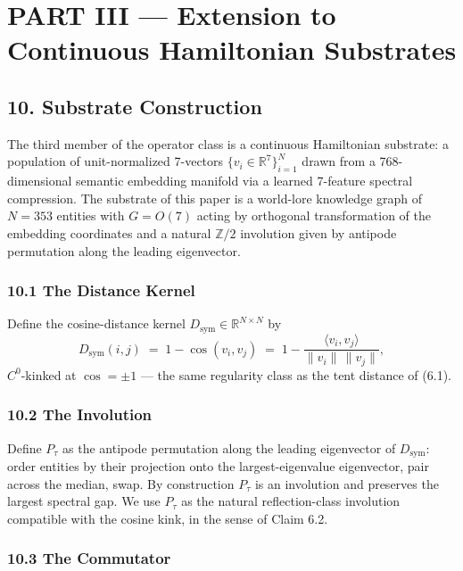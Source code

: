 \documentclass[
  11pt,
]{article}
\begin{document}
\section{PART III --- Extension to Continuous Hamiltonian
Substrates}\label{part-iii-extension-to-continuous-hamiltonian-substrates}

\subsection{10. Substrate Construction}\label{substrate-construction}

The third member of the operator class is a continuous Hamiltonian
substrate: a population of unit-normalized 7-vectors
\(\{v_i \in \mathbb{R}^7\}_{i=1}^N\) drawn from a 768-dimensional
semantic embedding manifold via a learned 7-feature spectral
compression. The substrate of this paper is a world-lore knowledge graph
of \(N = 353\) entities with \(G = O(7)\) acting by orthogonal
transformation of the embedding coordinates and a natural
\(\mathbb{Z}/2\) involution given by antipode permutation along the
leading eigenvector.

\subsubsection{10.1 The Distance Kernel}\label{the-distance-kernel}

Define the cosine-distance kernel
\(D_\text{sym} \in \mathbb{R}^{N \times N}\) by
\[D_\text{sym}(i, j) \;=\; 1 - \cos(v_i, v_j) \;=\; 1 - \frac{\langle v_i, v_j \rangle}{\|v_i\| \, \|v_j\|}, \tag{10.1}\]
\(C^0\)-kinked at \(\cos = \pm 1\) --- the same regularity class as the
tent distance of (6.1).

\subsubsection{10.2 The Involution}\label{the-involution}

Define \(P_\tau\) as the antipode permutation along the leading
eigenvector of \(D_\text{sym}\): order entities by their projection onto
the largest-eigenvalue eigenvector, pair across the median, swap. By
construction \(P_\tau\) is an involution and preserves the largest
spectral gap. We use \(P_\tau\) as the natural reflection-class
involution compatible with the cosine kink, in the sense of Claim 6.2.

\subsubsection{10.3 The Commutator}\label{the-commutator}
\end{document}
